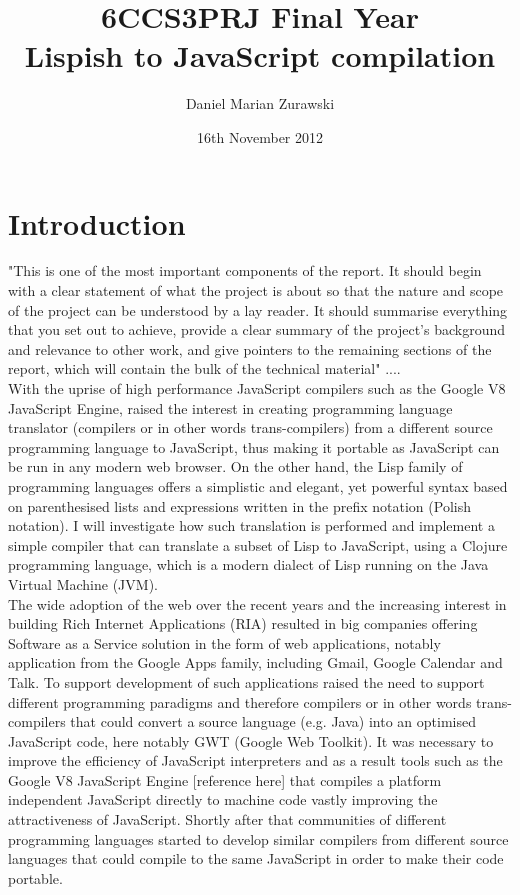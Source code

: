 \documentclass[11pt]{informatics-report}
\title{6CCS3PRJ Final Year\\\vspace{0.2cm}Lispish to JavaScript compilation}
\author{Daniel Marian Zurawski}
\date{16th November 2012}
\begin{document}
\createFrontMatter
\onehalfspacing
\tableofcontents
\doublespacing


\chapter{Introduction}
"This is one of the most important components of the report. It should begin with a clear statement of what the project is about so that the nature and scope of the project can be understood by a lay reader. It should summarise everything that you set out to achieve, provide a clear summary of the project's background and relevance to other work, and give pointers to the remaining sections of the report, which will contain the bulk of the technical material"  .... \\
With the uprise of high performance JavaScript compilers such as the Google V8 JavaScript Engine, raised the interest in creating programming language translator (compilers or in other words trans-compilers) from a different source programming language to JavaScript, thus making it portable as JavaScript can be run in any modern web browser. On the other hand, the Lisp family of programming languages offers a simplistic and elegant, yet powerful syntax based on parenthesised lists and expressions written in the prefix notation (Polish notation). I will investigate how such translation is performed and implement a simple compiler that can translate a subset of Lisp to JavaScript, using a Clojure programming language, which is a modern dialect of Lisp running on the Java Virtual Machine (JVM). \\
The wide adoption of the web over the recent years and the increasing interest in building Rich Internet Applications (RIA) resulted in big companies offering Software as a Service solution in the form of web applications, notably application from the Google Apps family, including Gmail, Google Calendar and Talk. To support development of such applications raised the need to support different programming paradigms and therefore compilers or in other words trans-compilers that could convert a source language (e.g. Java) into an optimised JavaScript code, here notably GWT (Google Web Toolkit). It was necessary to improve the efficiency of JavaScript interpreters and as a result tools such as the Google V8 JavaScript Engine [reference here] that compiles a platform independent JavaScript directly to machine code vastly improving the attractiveness of JavaScript. Shortly after that communities of different programming languages started to develop similar compilers from different source languages that could compile to the same JavaScript in order to make their code portable.
\end{document}
